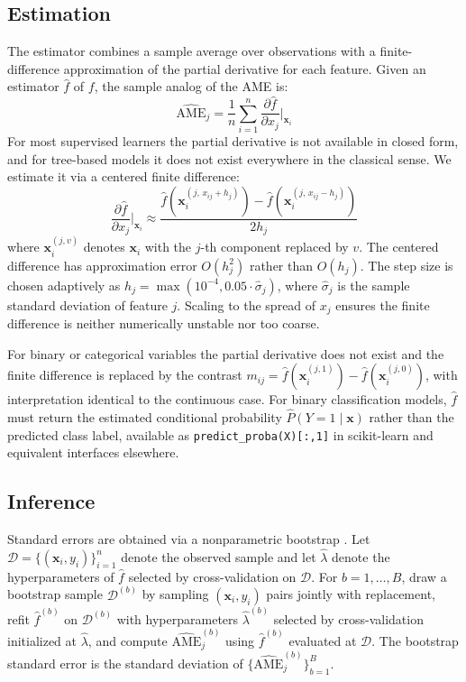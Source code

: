 \documentclass[conference]{IEEEtran}
\begin{document}
	\subsection{Estimation}
	
	The estimator combines a sample average over observations with a finite-difference approximation of the partial derivative for each feature. Given an estimator $\hat{f}$ of $f$, the sample analog of the AME is:
	\begin{equation}
		\widehat{\mathrm{AME}}_j = \frac{1}{n} \sum_{i=1}^n \frac{\partial \hat{f}}{\partial x_j}\bigg|_{\mathbf{x}_i}
	\end{equation}
	For most supervised learners the partial derivative is not available in closed form, and for tree-based models it does not exist everywhere in the classical sense. We estimate it via a centered finite difference:
	\begin{equation}
		\frac{\partial \hat{f}}{\partial x_j}\bigg|_{\mathbf{x}_i} \approx \frac{\hat{f}\!\left(\mathbf{x}_i^{(j,\, x_{ij} + h_j)}\right) - \hat{f}\!\left(\mathbf{x}_i^{(j,\, x_{ij} - h_j)}\right)}{2h_j}
	\end{equation}
	where $\mathbf{x}_i^{(j,v)}$ denotes $\mathbf{x}_i$ with the $j$-th component replaced by $v$. The centered difference has approximation error $O(h_j^2)$ rather than $O(h_j)$. The step size is chosen adaptively as $h_j = \max(10^{-4}, 0.05 \cdot \hat{\sigma}_j)$, where $\hat{\sigma}_j$ is the sample standard deviation of feature $j$. Scaling to the spread of $x_j$ ensures the finite difference is neither numerically unstable nor too coarse.
	
	For binary or categorical variables the partial derivative does not exist and the finite difference is replaced by the contrast $m_{ij} = \hat{f}(\mathbf{x}_i^{(j,1)}) - \hat{f}(\mathbf{x}_i^{(j,0)})$, with interpretation identical to the continuous case. For binary classification models, $\hat{f}$ must return the estimated conditional probability $\hat{P}(Y=1 \mid \mathbf{x})$ rather than the predicted class label, available as \texttt{predict\_proba(X)[:,1]} in scikit-learn and equivalent interfaces elsewhere.
	
	\subsection{Inference}
	
	Standard errors are obtained via a nonparametric bootstrap \cite{efron1979, efrontibshirani1993}. Let $\mathcal{D} = \{(\mathbf{x}_i, y_i)\}_{i=1}^n$ denote the observed sample and let $\hat{\lambda}$ denote the hyperparameters of $\hat{f}$ selected by cross-validation on $\mathcal{D}$. For $b = 1, \dots, B$, draw a bootstrap sample $\mathcal{D}^{(b)}$ by sampling $(\mathbf{x}_i, y_i)$ pairs jointly with replacement, refit $\hat{f}^{(b)}$ on $\mathcal{D}^{(b)}$ with hyperparameters $\hat{\lambda}^{(b)}$ selected by cross-validation initialized at $\hat{\lambda}$, and compute $\widehat{\mathrm{AME}}_j^{(b)}$ using $\hat{f}^{(b)}$ evaluated at $\mathcal{D}$. The bootstrap standard error is the standard deviation of $\{\widehat{\mathrm{AME}}_j^{(b)}\}_{b=1}^B$.
	
\end{document}
